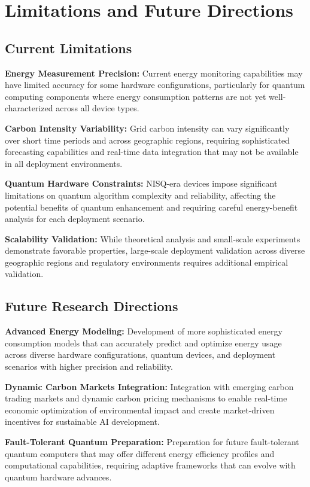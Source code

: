 \documentclass[10pt,journal,compsoc]{IEEEtran}
\begin{document}
\section{Limitations and Future Directions}

\subsection{Current Limitations}

\textbf{Energy Measurement Precision:} Current energy monitoring capabilities may have limited accuracy for some hardware configurations, particularly for quantum computing components where energy consumption patterns are not yet well-characterized across all device types.

\textbf{Carbon Intensity Variability:} Grid carbon intensity can vary significantly over short time periods and across geographic regions, requiring sophisticated forecasting capabilities and real-time data integration that may not be available in all deployment environments.

\textbf{Quantum Hardware Constraints:} NISQ-era devices impose significant limitations on quantum algorithm complexity and reliability, affecting the potential benefits of quantum enhancement and requiring careful energy-benefit analysis for each deployment scenario.

\textbf{Scalability Validation:} While theoretical analysis and small-scale experiments demonstrate favorable properties, large-scale deployment validation across diverse geographic regions and regulatory environments requires additional empirical validation.

\subsection{Future Research Directions}

\textbf{Advanced Energy Modeling:} Development of more sophisticated energy consumption models that can accurately predict and optimize energy usage across diverse hardware configurations, quantum devices, and deployment scenarios with higher precision and reliability.

\textbf{Dynamic Carbon Markets Integration:} Integration with emerging carbon trading markets and dynamic carbon pricing mechanisms to enable real-time economic optimization of environmental impact and create market-driven incentives for sustainable AI development.

\textbf{Fault-Tolerant Quantum Preparation:} Preparation for future fault-tolerant quantum computers that may offer different energy efficiency profiles and computational capabilities, requiring adaptive frameworks that can evolve with quantum hardware advances.
\end{document}
